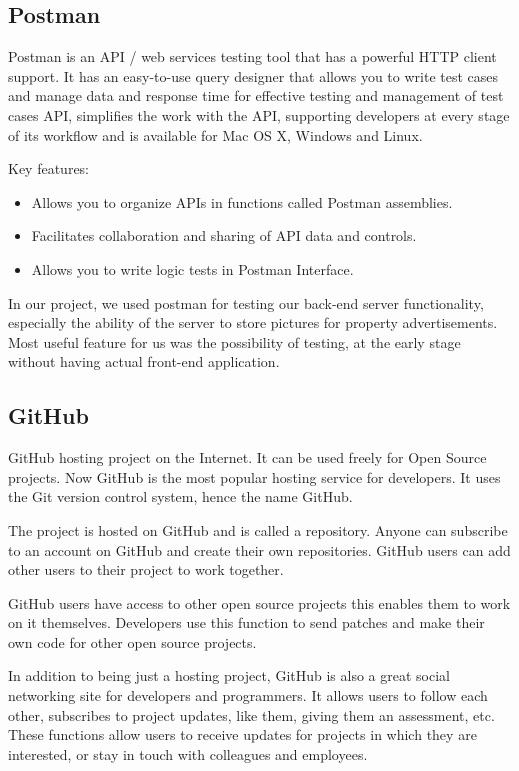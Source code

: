 \subsection{Postman}
Postman is an API / web services testing tool that has a powerful HTTP client support. It has an easy-to-use query designer that allows you to write test cases and manage data and response time for effective testing and management of test cases API, simplifies the work with the API, supporting developers at every stage of its workflow and is available for Mac OS X, Windows and Linux.\par
Key features:
\begin{itemize}
\item Allows you to organize APIs in functions called Postman assemblies.
\item Facilitates collaboration and sharing of API data and controls.
\item Allows you to write logic tests in Postman Interface. \cite{Postman}
\end{itemize}

In our project, we used postman for testing our back-end server functionality, especially the ability of the server to store pictures for property advertisements. Most useful feature for us was the possibility of testing, at the early stage without having actual front-end application.

\subsection{GitHub}
GitHub hosting project on the Internet. It can be used freely for Open Source projects. Now GitHub is the most popular hosting service for developers. It uses the Git version control system, hence the name GitHub.\par

The project is hosted on GitHub and is called a repository. Anyone can subscribe to an account on GitHub and create their own repositories. GitHub users can add other users to their project to work together.\par

GitHub users have access to other open source projects this enables them to work on it themselves. Developers use this function to send patches and make their own code for other open source projects.\par 

In addition to being just a hosting project, GitHub is also a great social networking site for developers and programmers. It allows users to follow each other, subscribes to project updates, like them, giving them an assessment, etc. These functions allow users to receive updates for projects in which they are interested, or stay in touch with colleagues and employees.\par

